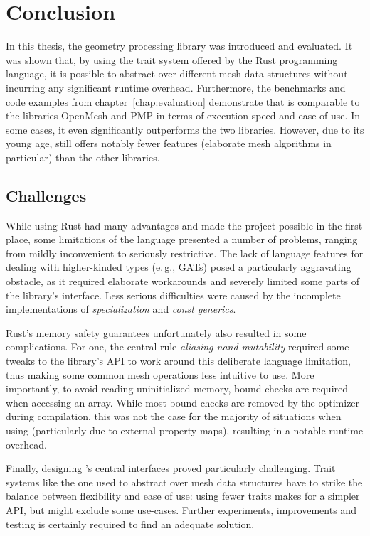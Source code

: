 \chapter{Conclusion}
\label{chap:conclusion}

In this thesis, the geometry processing library  was introduced and evaluated.
It was shown that, by using the trait system offered by the Rust programming language,  it is possible to abstract over different mesh data structures without incurring any significant runtime overhead.
Furthermore, the benchmarks and code examples from chapter~\ref{chap:evaluation} demonstrate that  is comparable to the \cpp libraries OpenMesh and PMP in terms of execution speed and ease of use.
In some cases, it even significantly outperforms the two \cpp libraries.
However, due to its young age,  still offers notably fewer features (elaborate mesh algorithms in particular) than the other libraries.

\vfill
\section{Challenges}

While using Rust had many advantages and made the project possible in the first place, some limitations of the language presented a number of problems, ranging from mildly inconvenient to seriously restrictive.
The lack of language features for dealing with higher-kinded types (e.\,g., GATs) posed a particularly aggravating obstacle, as it required elaborate workarounds and severely limited some parts of the library's interface.
Less serious difficulties were caused by the incomplete implementations of \emph{specialization} and \emph{const generics}.

Rust's memory safety guarantees unfortunately also resulted in some complications.
For one, the central rule \emph{aliasing nand mutability} required some tweaks to the library's API to work around this deliberate language limitation, thus making some common mesh operations less intuitive to use.
More importantly, to avoid reading uninitialized memory, bound checks are required when accessing an array.
While most bound checks are removed by the optimizer during compilation, this was not the case for the majority of situations when using  (particularly due to external property maps), resulting in a notable runtime overhead.

Finally, designing 's central interfaces proved particularly challenging.
Trait systems like the one used to abstract over mesh data structures have to strike the balance between flexibility and ease of use:
using fewer traits makes for a simpler API, but might exclude some use-cases.
Further experiments, improvements and testing is certainly required to find an adequate solution.

